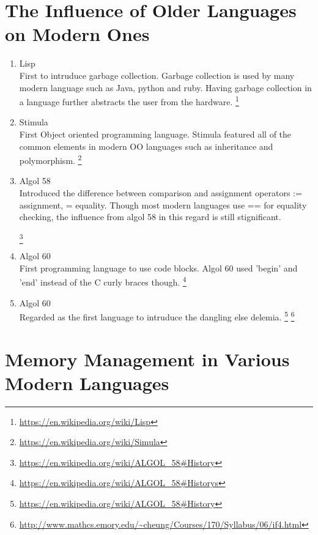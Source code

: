 \documentclass[11pt]{article}
\begin{document}
\newpage
\section{The Influence of Older Languages on Modern Ones}

\begin{enumerate}
\item Lisp\\
    First to intruduce garbage collection.  Garbage collection is used by many
        modern language such as Java, python and ruby.  Having garbage
        collection in a language further abstracts the user from the hardware.
    \footnote{\url{https://en.wikipedia.org/wiki/Lisp}}


\item Stimula\\
    First Object oriented programming language.  Stimula featured all of the
        common elements in modern OO languages such as inheritance and
        polymorphism.
    \footnote{\url{https://en.wikipedia.org/wiki/Simula}}


\item Algol 58\\
    Introduced the difference between comparison and assignment operators
        := assignment, = equality.  Though most modern languages use == for
        equality checking, the influence from algol 58 in this regard is still stignificant.

    \footnote{\url{https://en.wikipedia.org/wiki/ALGOL_58#History}}

\item Algol 60\\
    First programming language to use code blocks.  Algol 60 used 'begin' and
        'end' instead of the C curly braces though.
        \footnote{\url{https://en.wikipedia.org/wiki/ALGOL_58#Historys}}

\item Algol 60\\
    Regarded as the first language to intruduce the dangling else delemia.
    \footnote{\url{https://en.wikipedia.org/wiki/ALGOL_58#History}}
    \footnote{\url{http://www.mathcs.emory.edu/~cheung/Courses/170/Syllabus/06/if4.html}}

\end{enumerate}

\newpage
\section{Memory Management in Various Modern Languages}
\end{document}
